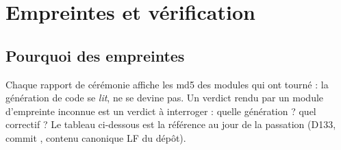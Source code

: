 \section{Empreintes et vérification}\label{sec:empreintslivre}

\subsection{Pourquoi des empreintes}

Chaque rapport de cérémonie affiche les md5 des modules qui ont tourné : la
génération de code se \emph{lit}, ne se devine pas. Un verdict rendu par un module
d'empreinte inconnue est un verdict à interroger : quelle génération ? quel correctif
? Le tableau ci-dessous est la référence au jour de la passation (D133, commit
, contenu canonique LF du dépôt).

